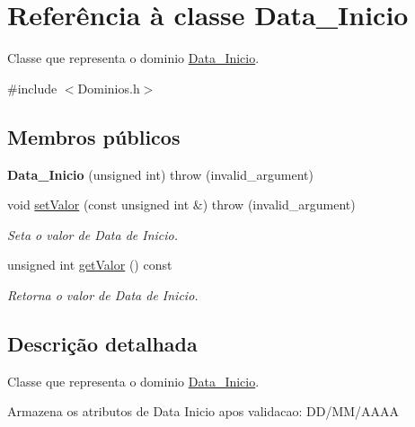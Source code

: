\hypertarget{class_data___inicio}{
\section{\-Referência à classe \-Data\-\_\-\-Inicio}
\label{class_data___inicio}
}


\-Classe que representa o dominio \hyperlink{class_data___inicio}{\-Data\-\_\-\-Inicio}.  




{\ttfamily \#include $<$\-Dominios.\-h$>$}

\subsection*{\-Membros públicos}
\begin{DoxyCompactItemize}
\item 
\hypertarget{class_data___inicio_a06c1030d303ff22ba6d56f37e2777022}{
{\bfseries \-Data\-\_\-\-Inicio} (unsigned int)  throw (invalid\-\_\-argument)}
\label{class_data___inicio_a06c1030d303ff22ba6d56f37e2777022}

\item 
void \hyperlink{class_data___inicio_a9120a3bac68b85c6b9e625e7e3e510a5}{set\-Valor} (const unsigned int \&)  throw (invalid\-\_\-argument)
\begin{DoxyCompactList}\small\item\em \-Seta o valor de \-Data de \-Inicio. \end{DoxyCompactList}\item 
unsigned int \hyperlink{class_data___inicio_a31ec34b69439996c14d443c5687e9565}{get\-Valor} () const 
\begin{DoxyCompactList}\small\item\em \-Retorna o valor de \-Data de \-Inicio. \end{DoxyCompactList}\end{DoxyCompactItemize}


\subsection{\-Descrição detalhada}
\-Classe que representa o dominio \hyperlink{class_data___inicio}{\-Data\-\_\-\-Inicio}. 

\-Armazena os atributos de \-Data \-Inicio apos validacao\-: \-D\-D/\-M\-M/\-A\-A\-A\-A 

